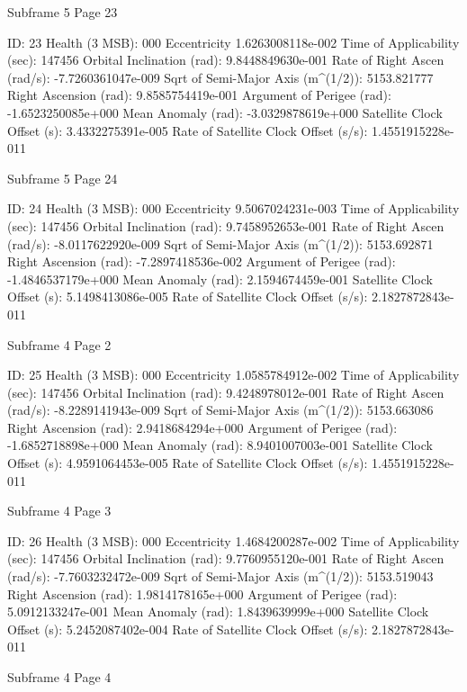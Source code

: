  Subframe  5 Page 23

 ID:				     23
 Health (3 MSB):		     000
 Eccentricity			     1.6263008118e-002
 Time of Applicability (sec):	       147456
 Orbital Inclination (rad):	     9.8448849630e-001
 Rate of Right Ascen (rad/s):	     -7.7260361047e-009
 Sqrt of Semi-Major Axis (m^(1/2)):  5153.821777
 Right Ascension (rad): 	     9.8585754419e-001
 Argument of Perigee (rad):	     -1.6523250085e+000
 Mean Anomaly (rad):		     -3.0329878619e+000
 Satellite Clock Offset (s):	     3.4332275391e-005
 Rate of Satellite Clock Offset (s/s): 1.4551915228e-011

 Subframe  5 Page 24

 ID:				     24
 Health (3 MSB):		     000
 Eccentricity			     9.5067024231e-003
 Time of Applicability (sec):	       147456
 Orbital Inclination (rad):	     9.7458952653e-001
 Rate of Right Ascen (rad/s):	     -8.0117622920e-009
 Sqrt of Semi-Major Axis (m^(1/2)):  5153.692871
 Right Ascension (rad): 	     -7.2897418536e-002
 Argument of Perigee (rad):	     -1.4846537179e+000
 Mean Anomaly (rad):		     2.1594674459e-001
 Satellite Clock Offset (s):	     5.1498413086e-005
 Rate of Satellite Clock Offset (s/s): 2.1827872843e-011

 Subframe  4 Page  2

 ID:				     25
 Health (3 MSB):		     000
 Eccentricity			     1.0585784912e-002
 Time of Applicability (sec):	       147456
 Orbital Inclination (rad):	     9.4248978012e-001
 Rate of Right Ascen (rad/s):	     -8.2289141943e-009
 Sqrt of Semi-Major Axis (m^(1/2)):  5153.663086
 Right Ascension (rad): 	     2.9418684294e+000
 Argument of Perigee (rad):	     -1.6852718898e+000
 Mean Anomaly (rad):		     8.9401007003e-001
 Satellite Clock Offset (s):	     4.9591064453e-005
 Rate of Satellite Clock Offset (s/s): 1.4551915228e-011

 Subframe  4 Page  3

 ID:				     26
 Health (3 MSB):		     000
 Eccentricity			     1.4684200287e-002
 Time of Applicability (sec):	       147456
 Orbital Inclination (rad):	     9.7760955120e-001
 Rate of Right Ascen (rad/s):	     -7.7603232472e-009
 Sqrt of Semi-Major Axis (m^(1/2)):  5153.519043
 Right Ascension (rad): 	     1.9814178165e+000
 Argument of Perigee (rad):	     5.0912133247e-001
 Mean Anomaly (rad):		     1.8439639999e+000
 Satellite Clock Offset (s):	     5.2452087402e-004
 Rate of Satellite Clock Offset (s/s): 2.1827872843e-011

 Subframe  4 Page  4


